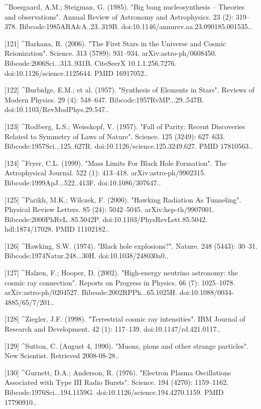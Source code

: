 ^Boesgaard, A.M.; Steigman, G. (1985). "Big bang nucleosynthesis – Theories and observations". Annual Review of Astronomy and Astrophysics. 23 (2): 319–378. Bibcode:1985ARA&A..23..319B. doi:10.1146/annurev.aa.23.090185.001535..

[121]
^Barkana, R. (2006). "The First Stars in the Universe and Cosmic Reionization". Science. 313 (5789): 931–934. arXiv:astro-ph/0608450. Bibcode:2006Sci...313..931B. CiteSeerX 10.1.1.256.7276. doi:10.1126/science.1125644. PMID 16917052..

[122]
^Burbidge, E.M.; et al. (1957). "Synthesis of Elements in Stars". Reviews of Modern Physics. 29 (4): 548–647. Bibcode:1957RvMP...29..547B. doi:10.1103/RevModPhys.29.547..

[123]
^Rodberg, L.S.; Weisskopf, V. (1957). "Fall of Parity: Recent Discoveries Related to Symmetry of Laws of Nature". Science. 125 (3249): 627–633. Bibcode:1957Sci...125..627R. doi:10.1126/science.125.3249.627. PMID 17810563..

[124]
^Fryer, C.L. (1999). "Mass Limits For Black Hole Formation". The Astrophysical Journal. 522 (1): 413–418. arXiv:astro-ph/9902315. Bibcode:1999ApJ...522..413F. doi:10.1086/307647..

[125]
^Parikh, M.K.; Wilczek, F. (2000). "Hawking Radiation As Tunneling". Physical Review Letters. 85 (24): 5042–5045. arXiv:hep-th/9907001. Bibcode:2000PhRvL..85.5042P. doi:10.1103/PhysRevLett.85.5042. hdl:1874/17028. PMID 11102182..

[126]
^Hawking, S.W. (1974). "Black hole explosions?". Nature. 248 (5443): 30–31. Bibcode:1974Natur.248...30H. doi:10.1038/248030a0..

[127]
^Halzen, F.; Hooper, D. (2002). "High-energy neutrino astronomy: the cosmic ray connection". Reports on Progress in Physics. 66 (7): 1025–1078. arXiv:astro-ph/0204527. Bibcode:2002RPPh...65.1025H. doi:10.1088/0034-4885/65/7/201..

[128]
^Ziegler, J.F. (1998). "Terrestrial cosmic ray intensities". IBM Journal of Research and Development. 42 (1): 117–139. doi:10.1147/rd.421.0117..

[129]
^Sutton, C. (August 4, 1990). "Muons, pions and other strange particles". New Scientist. Retrieved 2008-08-28..

[130]
^Gurnett, D.A.; Anderson, R. (1976). "Electron Plasma Oscillations Associated with Type III Radio Bursts". Science. 194 (4270): 1159–1162. Bibcode:1976Sci...194.1159G. doi:10.1126/science.194.4270.1159. PMID 17790910..

